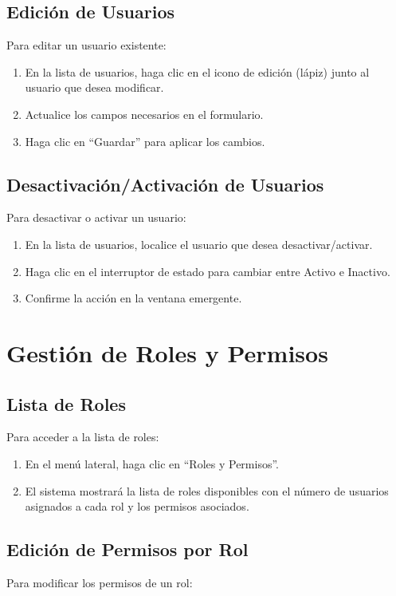 \documentclass[12pt,a4paper]{book}
\begin{document}
\subsection{Edición de Usuarios}
Para editar un usuario existente:

\begin{enumerate}
    \item En la lista de usuarios, haga clic en el icono de edición (lápiz) junto al usuario que desea modificar.
    \item Actualice los campos necesarios en el formulario.
    \item Haga clic en ``Guardar'' para aplicar los cambios.
\end{enumerate}

\subsection{Desactivación/Activación de Usuarios}
Para desactivar o activar un usuario:

\begin{enumerate}
    \item En la lista de usuarios, localice el usuario que desea desactivar/activar.
    \item Haga clic en el interruptor de estado para cambiar entre Activo e Inactivo.
    \item Confirme la acción en la ventana emergente.
\end{enumerate}

\section{Gestión de Roles y Permisos}
\subsection{Lista de Roles}
Para acceder a la lista de roles:

\begin{enumerate}
    \item En el menú lateral, haga clic en ``Roles y Permisos''.
    \item El sistema mostrará la lista de roles disponibles con el número de usuarios asignados a cada rol y los permisos asociados.
\end{enumerate}

\subsection{Edición de Permisos por Rol}
Para modificar los permisos de un rol:
\end{document}

